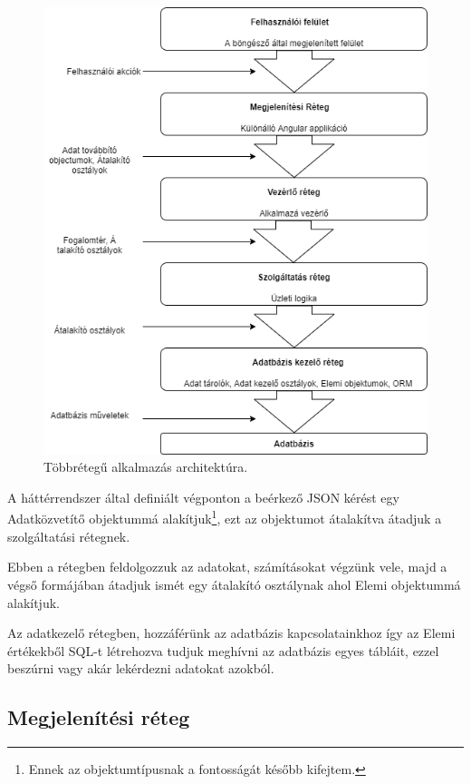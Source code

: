 \begin{figure}[h]
	\centering
	\includegraphics[scale=0.6]{images/applikacio_architektura.png}
	\caption{Többrétegű alkalmazás architektúra.}
	\label{fig:architektura}
\end{figure}

A háttérrendszer által definiált végponton a beérkező JSON kérést egy Adatközvetítő objektummá alakítjuk\footnote{Ennek az objektumtípusnak a fontosságát később kifejtem.}, ezt az objektumot átalakítva átadjuk a szolgáltatási rétegnek. 

Ebben a rétegben feldolgozzuk az adatokat, számításokat végzünk vele, majd a végső formájában átadjuk ismét egy átalakító osztálynak ahol Elemi objektummá alakítjuk.

Az adatkezelő rétegben, hozzáférünk az adatbázis kapcsolatainkhoz így az Elemi értékekből SQL-t létrehozva tudjuk meghívni az adatbázis egyes tábláit, ezzel beszúrni vagy akár lekérdezni adatokat azokból.

\subsection{Megjelenítési réteg}


